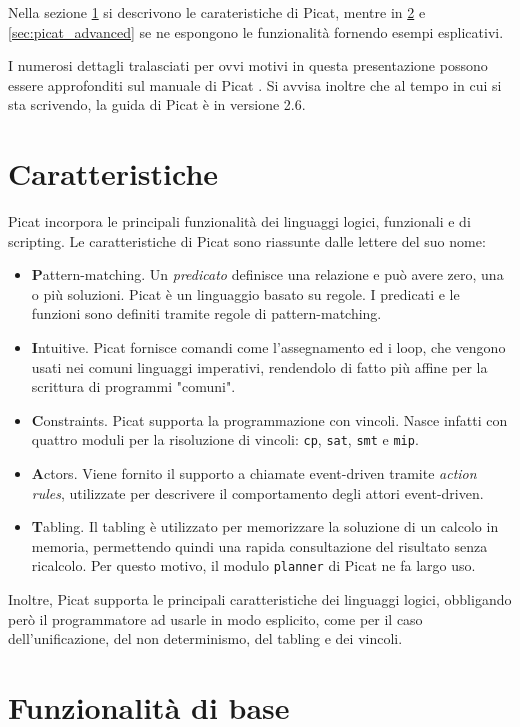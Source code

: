 \documentclass[12pt,a4paper,openright]{book} %
\begin{document}
Nella sezione \ref{sec:picat_features} si descrivono le carateristiche di Picat, mentre in \ref{sec:picat_base} e \ref{sec:picat_advanced} se ne espongono le funzionalità fornendo esempi esplicativi. 

I numerosi dettagli tralasciati per ovvi motivi in questa presentazione possono essere approfonditi sul manuale di Picat \cite{PicatGuide}. Si avvisa inoltre che al tempo in cui si sta scrivendo, la guida di Picat è in versione 2.6.

\section{Caratteristiche}
\label{sec:picat_features}

Picat incorpora le principali funzionalità dei linguaggi logici, funzionali e di scripting. Le caratteristiche di Picat sono riassunte dalle lettere del suo nome:
\begin{itemize}
\item \textbf{P}attern-matching. Un \emph{predicato} definisce una relazione e può avere zero, una o più soluzioni. Picat è un linguaggio basato su regole. I predicati e le funzioni sono definiti tramite regole di pattern-matching.
\item \textbf{I}ntuitive. Picat fornisce comandi come l'assegnamento ed i loop, che vengono usati nei comuni linguaggi imperativi, rendendolo di fatto più affine per la scrittura di programmi "comuni".
\item \textbf{C}onstraints. Picat supporta la programmazione con vincoli. Nasce infatti con quattro moduli per la risoluzione di vincoli: \verb|cp|, \verb|sat|, \verb|smt| e \verb|mip|.
\item \textbf{A}ctors. Viene fornito il supporto a chiamate event-driven tramite \emph{action rules}, utilizzate per descrivere il comportamento degli attori event-driven.
\item \textbf{T}abling. Il tabling è utilizzato per memorizzare la soluzione di un calcolo in memoria, permettendo quindi una rapida consultazione del risultato senza ricalcolo. Per questo motivo, il modulo \verb|planner| di Picat ne fa largo uso. 
\end{itemize}

Inoltre, Picat supporta le principali caratteristiche dei linguaggi logici, obbligando però il programmatore ad usarle in modo esplicito, come per il caso dell'unificazione, del non determinismo, del tabling e dei vincoli.

\section{Funzionalità di base}
\label{sec:picat_base}
\end{document}
